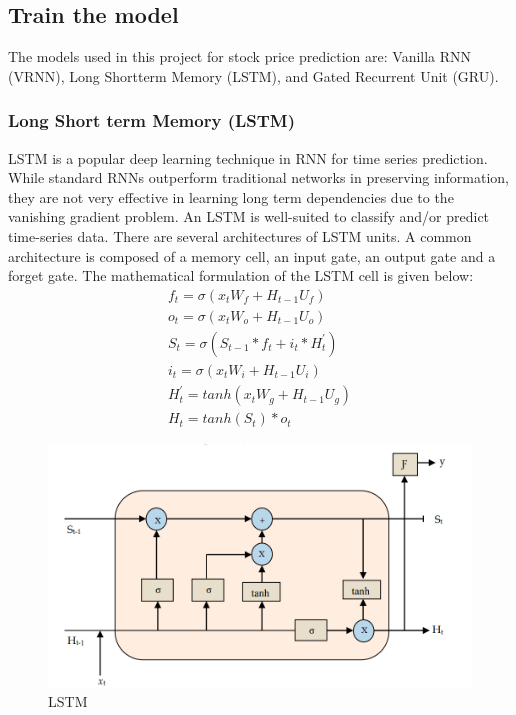 \subsection{Train the model}
\vspace{-18pt}
The models used in this project for stock price prediction are: Vanilla RNN (VRNN), Long Shortterm Memory (LSTM), and Gated Recurrent Unit (GRU).
\par 
\subsubsection{Long Short term Memory (LSTM)}
\vspace{-18pt}
LSTM is a popular deep learning technique in RNN for time series prediction. While standard RNNs outperform traditional networks in preserving information, they are not very effective in learning long term dependencies due to the vanishing gradient problem. An LSTM is well-suited to classify and/or predict time-series data. There are several architectures of LSTM units. A common architecture is composed of a memory cell, an input gate, an output gate and a forget gate. The mathematical formulation of the LSTM cell is given below:
\begin{eqnarray}
f_t = \sigma(x_tW_f + H_{t-1}U_f)\\
o_t = \sigma(x_tW_o + H_{t-1}U_o)\\
S_t = \sigma(S_{t-1} *f_t + i_t * H^{'}_t)\\
i_t = \sigma(x_tW_i + H_{t-1}U_i)\\
H^{'}_t = tanh(x_tW_g + H_{t-1}U_g)\\
H_t = tanh(S_t)*o_t
\end{eqnarray}
\begin{figure}[tbh] %
\begin{center}
	\includegraphics[width=6in]{images/l1.png} 
	\caption{LSTM} %
	\label{LSTM} %
\end{center}
\end{figure}

